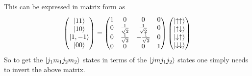 \documentclass{article}
\begin{document}
This can be expressed in matrix form as 
\[\begin{pmatrix}\ket{11} \\ \ket{10} \\ \ket{1,-1} \\ \ket{00} \end{pmatrix} = \begin{pmatrix} 1 & 0 & 0 & 0 \\ 0 & \frac{1}{\sqrt{2}} & \frac{1}{\sqrt{2}} & 0 \\
0 & \frac{1}{\sqrt{2}} & -\frac{1}{\sqrt{2}} & 0 \\ 0 & 0 & 0 & 1 \end{pmatrix} \begin{pmatrix} \ket{\uparrow\uparrow} \\ \ket{\uparrow\downarrow} \\ \ket{\downarrow\uparrow} \\  \ket{\downarrow\downarrow}  \end{pmatrix} \]
So to get the $\ket{j_1m_1j_2m_2}$ states in terms of the $\ket{jmj_1j_2}$ states one simply needs to invert the above matrix.
\end{document}
